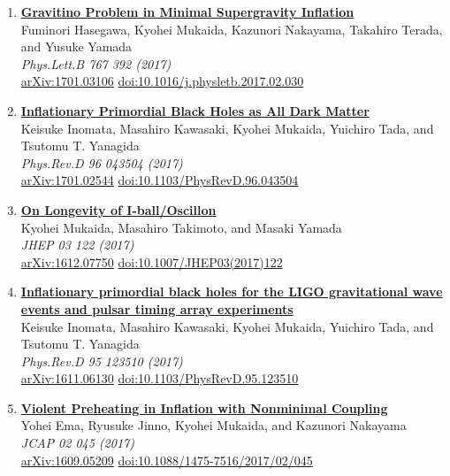 \begin{enumerate}
\item \textbf{\href{https://arxiv.org/abs/1701.03106}{Gravitino Problem in Minimal Supergravity Inflation}}\\
Fuminori Hasegawa, Kyohei Mukaida, Kazunori Nakayama, Takahiro Terada, and Yusuke Yamada\\
\emph{Phys.Lett.B 767 392 (2017)}
\\ \href{https://arxiv.org/abs/1701.03106}{arXiv:1701.03106} \href{https://doi.org/10.1016/j.physletb.2017.02.030}{doi:10.1016/j.physletb.2017.02.030}

\item \textbf{\href{https://arxiv.org/abs/1701.02544}{Inflationary Primordial Black Holes as All Dark Matter}}\\
Keisuke Inomata, Masahiro Kawasaki, Kyohei Mukaida, Yuichiro Tada, and Tsutomu T. Yanagida\\
\emph{Phys.Rev.D 96 043504 (2017)}
\\ \href{https://arxiv.org/abs/1701.02544}{arXiv:1701.02544} \href{https://doi.org/10.1103/PhysRevD.96.043504}{doi:10.1103/PhysRevD.96.043504}

\item \textbf{\href{https://arxiv.org/abs/1612.07750}{On Longevity of I-ball/Oscillon}}\\
Kyohei Mukaida, Masahiro Takimoto, and Masaki Yamada\\
\emph{JHEP 03 122 (2017)}
\\ \href{https://arxiv.org/abs/1612.07750}{arXiv:1612.07750} \href{https://doi.org/10.1007/JHEP03(2017)122}{doi:10.1007/JHEP03(2017)122}

\item \textbf{\href{https://arxiv.org/abs/1611.06130}{Inflationary primordial black holes for the LIGO gravitational wave events and pulsar timing array experiments}}\\
Keisuke Inomata, Masahiro Kawasaki, Kyohei Mukaida, Yuichiro Tada, and Tsutomu T. Yanagida\\
\emph{Phys.Rev.D 95 123510 (2017)}
\\ \href{https://arxiv.org/abs/1611.06130}{arXiv:1611.06130} \href{https://doi.org/10.1103/PhysRevD.95.123510}{doi:10.1103/PhysRevD.95.123510}

\item \textbf{\href{https://arxiv.org/abs/1609.05209}{Violent Preheating in Inflation with Nonminimal Coupling}}\\
Yohei Ema, Ryusuke Jinno, Kyohei Mukaida, and Kazunori Nakayama\\
\emph{JCAP 02 045 (2017)}
\\ \href{https://arxiv.org/abs/1609.05209}{arXiv:1609.05209} \href{https://doi.org/10.1088/1475-7516/2017/02/045}{doi:10.1088/1475-7516/2017/02/045}


\end{enumerate}
